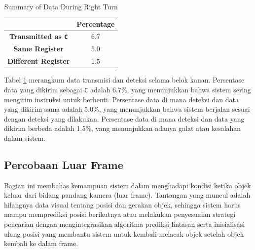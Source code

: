 \begin{table}[H]
    \centering
    \caption{Summary of Data During Right Turn}
    \label{tab:right_turn_data_transmission_detection}
    \begin{tabular}{|c|c|}
        \hline 
        \cellcolor[HTML]{000000} & \cellcolor[HTML]{C0C0C0} \textbf{Percentage}   \\ \hline
        \cellcolor[HTML]{C0C0C0} \textbf{Transmitted as \texttt{C}} & 6.7  \\ \hline
        \cellcolor[HTML]{C0C0C0} \textbf{Same Register}  & 5.0  \\ \hline
        \cellcolor[HTML]{C0C0C0} \textbf{Different Register}   & 1.5  \\ \hline
    \end{tabular}
\end{table}

Tabel \ref{tab:right_turn_data_transmission_detection} merangkum data transmisi dan deteksi selama belok kanan. Persentase data yang dikirim sebagai \texttt{C} adalah 6.7\%, yang menunjukkan bahwa sistem sering mengirim instruksi untuk berhenti. Persentase data di mana deteksi dan data yang dikirim sama adalah 5.0\%, yang menunjukkan bahwa sistem berjalan sesuai dengan deteksi yang dilakukan. Persentase data di mana deteksi dan data yang dikirim berbeda adalah 1.5\%, yang menunjukkan adanya galat atau kesalahan dalam sistem.

\newpage
\subsection{Percobaan Luar Frame}
\label{subsec:percobaanluarframe}

Bagian ini membahas kemampuan sistem dalam menghadapi kondisi ketika objek keluar dari bidang pandang kamera (luar frame). Tantangan yang muncul adalah hilangnya data visual tentang posisi dan gerakan objek, sehingga sistem harus mampu memprediksi posisi berikutnya atau melakukan penyesuaian strategi pencarian dengan mengintegrasikan algoritma prediksi lintasan serta inisialisasi ulang posisi yang membantu sistem untuk kembali melacak objek setelah objek kembali ke dalam frame.

